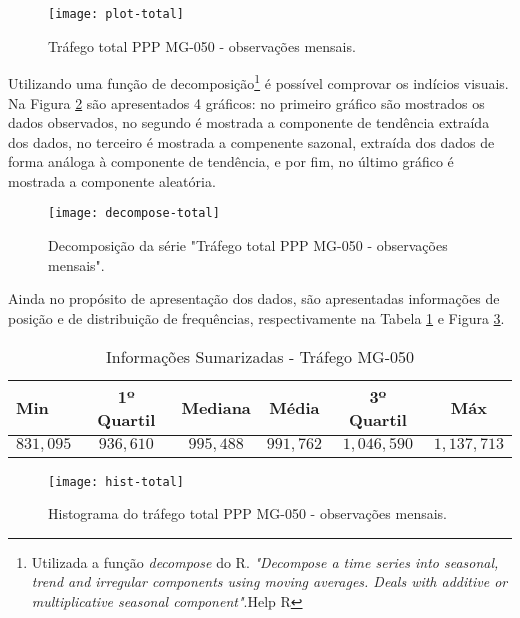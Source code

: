 \documentclass[
	12pt,				%
	openright,			%
	twoside,			%
	a4paper,			%
	english,			%
	french,				%
	spanish,			%
	brazil				%
	]{abntex2}
\begin{document}
\begin{figure}[h]
\caption{\label{fig:plot-total} Tráfego total PPP MG-050 - observações mensais.}
\centering
\texttt{[image: plot-total]}
\end{figure}

Utilizando uma função de decomposição\footnote{ Utilizada a função \emph{decompose} do R. \emph{"Decompose a time series into seasonal, trend and irregular components using moving averages. Deals with additive or multiplicative seasonal component"}.Help R} é possível comprovar os indícios visuais. Na Figura \ref{fig:decompose-total}  são apresentados 4 gráficos: no primeiro gráfico são mostrados os dados observados, no segundo é mostrada a componente de tendência extraída dos dados, no terceiro é mostrada a compenente sazonal, extraída dos dados de forma análoga à componente de tendência, e por fim, no último gráfico é mostrada a componente aleatória.

\begin{figure}[h]
\caption{\label{fig:decompose-total} Decomposição da série "Tráfego total PPP MG-050 - observações mensais".}
\centering
\texttt{[image: decompose-total]}
\end{figure}

Ainda no propósito de apresentação dos dados, são apresentadas informações de posição e de distribuição de frequências, respectivamente na Tabela \ref{tab:summary} e Figura \ref{fig:hist-total}.

\begin{table}[h]
\ABNTEXfontereduzida\caption{Informações Sumarizadas - Tráfego MG-050}
\label{tab:summary}
\centering
\begin{tabular}{l c c c c c}

\toprule

Min & 1º Quartil & Mediana & Média & 3º Quartil & Máx \\
\midrule
$831,095$ & $936,610$ & $995,488$ & $991,762$ & $1,046,590$ & $1,137,713$\\

\bottomrule
\end{tabular}
\end{table}

\begin{figure}[h]
\caption{\label{fig:hist-total} Histograma do tráfego total PPP MG-050 - observações mensais.}
\centering
\texttt{[image: hist-total]}
\end{figure}
\end{document}
